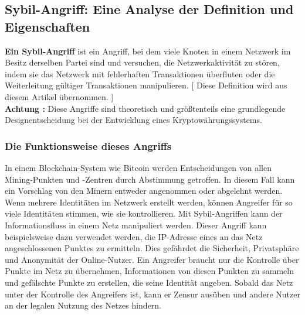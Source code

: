 \subsection{Sybil-Angriff: Eine Analyse der Definition und Eigenschaften}
\textbf{Ein Sybil-Angriff} ist ein Angriff, bei dem viele Knoten in einem Netzwerk im Besitz derselben Partei sind und versuchen, die Netzwerkaktivität zu stören, indem sie das Netzwerk mit fehlerhaften Transaktionen überfluten oder die Weiterleitung gültiger Transaktionen manipulieren. [ Diese Definition wird aus diesem Artikel \cite{allatacks} übernommen. ]\\
\textbf{ Achtung :} Diese Angriffe sind theoretisch und größtenteils eine grundlegende Designentscheidung bei der Entwicklung eines Kryptowährungssystems.
\subsubsection{Die Funktionsweise dieses Angriffs}
In einem Blockchain-System wie Bitcoin werden Entscheidungen von allen Mining-Punkten und -Zentren durch Abstimmung getroffen. In diesem Fall kann ein Vorschlag von den Minern entweder angenommen oder abgelehnt werden. Wenn mehrere Identitäten im Netzwerk erstellt werden, können Angreifer für so viele Identitäten stimmen, wie sie kontrollieren.
Mit Sybil-Angriffen kann der Informationsfluss in einem Netz manipuliert werden. Dieser Angriff kann beispielsweise dazu verwendet werden, die IP-Adresse eines an das Netz angeschlossenen Punktes zu ermitteln. Dies gefährdet die Sicherheit, Privatsphäre und Anonymität der Online-Nutzer. Ein Angreifer braucht nur die Kontrolle über Punkte im Netz zu übernehmen, Informationen von diesen Punkten zu sammeln und gefälschte Punkte zu erstellen, die seine Identität angeben.
Sobald das Netz unter der Kontrolle des Angreifers ist, kann er Zensur ausüben und andere Nutzer an der legalen Nutzung des Netzes hindern.
